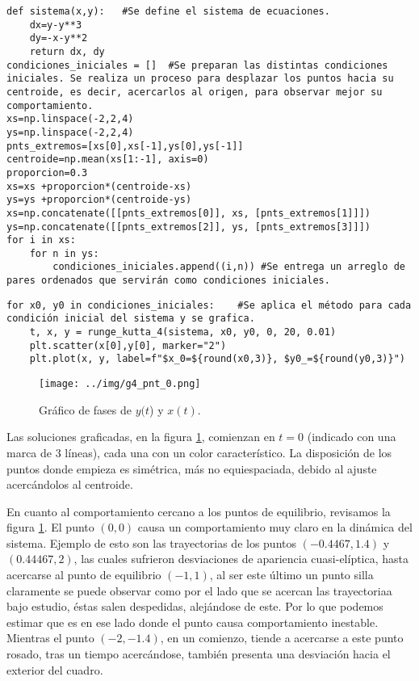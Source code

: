 \documentclass[../portafolio.tex]{subfiles}
\begin{document}
\begin{verbatim}
def sistema(x,y):	#Se define el sistema de ecuaciones.
    dx=y-y**3
    dy=-x-y**2
    return dx, dy
condiciones_iniciales = []	#Se preparan las distintas condiciones iniciales. Se realiza un proceso para desplazar los puntos hacia su centroide, es decir, acercarlos al origen, para observar mejor su comportamiento.
xs=np.linspace(-2,2,4)
ys=np.linspace(-2,2,4)
pnts_extremos=[xs[0],xs[-1],ys[0],ys[-1]]	
centroide=np.mean(xs[1:-1], axis=0)
proporcion=0.3
xs=xs +proporcion*(centroide-xs)
ys=ys +proporcion*(centroide-ys)
xs=np.concatenate([[pnts_extremos[0]], xs, [pnts_extremos[1]]])
ys=np.concatenate([[pnts_extremos[2]], ys, [pnts_extremos[3]]])
for i in xs:
    for n in ys:
        condiciones_iniciales.append((i,n))	#Se entrega un arreglo de pares ordenados que servirán como condiciones iniciales.
\end{verbatim}

\begin{verbatim}
for x0, y0 in condiciones_iniciales:	#Se aplica el método para cada condición inicial del sistema y se grafica.
    t, x, y = runge_kutta_4(sistema, x0, y0, 0, 20, 0.01)
    plt.scatter(x[0],y[0], marker="2")
    plt.plot(x, y, label=f"$x_0=${round(x0,3)}, $y0_=${round(y0,3)}")
\end{verbatim}
\begin{figure}
\centering
\texttt{[image: ../img/g4\_pnt\_0.png]}
\caption{Gráfico de fases de $y(t$) y $x(t)$. \label{g4_ej10:graf_0}}
\end{figure}
Las soluciones graficadas, en la figura \ref{g4_ej10:graf_0}, comienzan en $t=0$ (indicado con una marca de 3 líneas), cada una con un color característico. La disposición de los puntos donde empieza es simétrica, más no equiespaciada, debido al ajuste acercándolos al centroide.

En cuanto al comportamiento cercano a los puntos de equilibrio, revisamos la figura \ref{g4_ej10:graf_0}. El punto $(0,0)$ causa un comportamiento muy claro en la dinámica del sistema. Ejemplo de esto son las trayectorias de los puntos $(-0.4467,1.4)$ y $(0.44467,2)$, las cuales sufrieron desviaciones de apariencia cuasi-elíptica, hasta acercarse al punto de equilibrio $(-1,1)$, al ser este último un punto silla claramente se puede observar como por el lado que se acercan las trayectoriaa bajo estudio, éstas salen despedidas, alejándose de este. Por lo que podemos estimar que es en ese lado donde el punto causa comportamiento inestable. Mientras el punto $(-2,-1.4)$, en un comienzo, tiende a acercarse a este punto rosado, tras un tiempo acercándose, también presenta una desviación hacia el exterior del cuadro.
\end{document}
